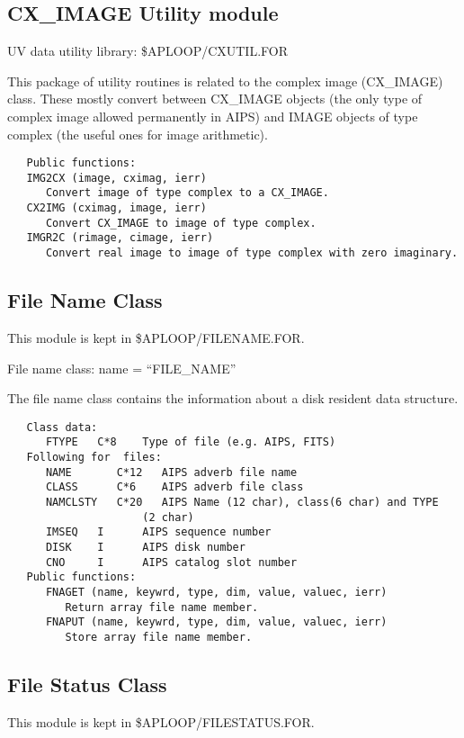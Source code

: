 \subsection{CX\_IMAGE Utility module}
   UV data utility library: \$APLOOP/CXUTIL.FOR

   This package of utility routines is related to the complex image
(CX\_IMAGE) class.  These mostly convert between CX\_IMAGE objects (the
only type of complex image allowed permanently in AIPS) and IMAGE
objects of type complex (the useful ones for image arithmetic).

{\small\begin{verbatim}
   Public functions:
   IMG2CX (image, cximag, ierr)
      Convert image of type complex to a CX_IMAGE.
   CX2IMG (cximag, image, ierr)
      Convert CX_IMAGE to image of type complex.
   IMGR2C (rimage, cimage, ierr)
      Convert real image to image of type complex with zero imaginary.
\end{verbatim}}


\subsection{File Name Class}

   This module is kept in \$APLOOP/FILENAME.FOR.

   File name class: name = ``FILE\_NAME''

   The file name class contains the information about a disk resident
data structure.
{\small\begin{verbatim}
   Class data:
      FTYPE   C*8    Type of file (e.g. AIPS, FITS)
   Following for  files:
      NAME       C*12   AIPS adverb file name
      CLASS      C*6    AIPS adverb file class
      NAMCLSTY   C*20   AIPS Name (12 char), class(6 char) and TYPE
                     (2 char)
      IMSEQ   I      AIPS sequence number
      DISK    I      AIPS disk number
      CNO     I      AIPS catalog slot number
   Public functions:
      FNAGET (name, keywrd, type, dim, value, valuec, ierr)
         Return array file name member.
      FNAPUT (name, keywrd, type, dim, value, valuec, ierr)
         Store array file name member.
\end{verbatim}}

\subsection{File Status Class}

   This module is kept in \$APLOOP/FILESTATUS.FOR.

